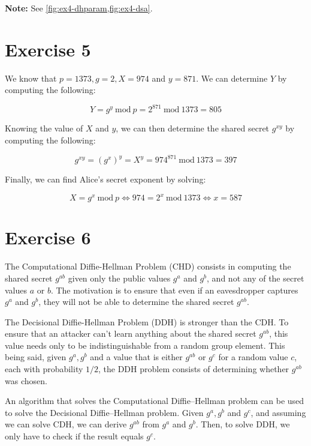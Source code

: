 \documentclass[a4paper]{article}
\begin{document}
\vspace{\baselineskip}

\textbf{Note:} See \cref{fig:ex4-dhparam,fig:ex4-dsa}.

\section*{Exercise 5}

We know that $p = 1373, g = 2, X = 974$ and $y = 871$. We can determine $Y$ by computing the
following:

\[
Y = g^y \ \mathrm{mod} \ p = 2^{871} \ \mathrm{mod} \ 1373 = 805
\]

Knowing the value of $X$ and $y$, we can then determine the shared secret $g^{xy}$ by computing
the following:

\[
g^{xy} = (g^x)^y = X ^ y = 974 ^ {871} \ \mathrm{mod} \ 1373 = 397
\]

\pagebreak

Finally, we can find Alice's secret exponent by solving:

\[
X = g^x \ \mathrm{mod} \ p \Leftrightarrow 974 = 2^x \ \mathrm{mod} \ 1373 \Leftrightarrow x = 587
\]

\section*{Exercise 6}

The Computational Diffie-Hellman Problem (CHD) consists in computing the shared secret $g^{ab}$ given
only the public values $g^a$ and $g^b$, and not any of the secret values $a$ or $b$. The motivation
is to ensure that even if an eavesdropper captures $g^a$ and $g^b$, they will not be able to determine
the shared secret $g^{ab}$.

The Decisional Diffie-Hellman Problem (DDH) is stronger than the CDH. To ensure that an attacker can't
learn anything about the shared secret $g^{ab}$, this value needs only to be indistinguishable from a
random group element. This being said, given $g^a, g^b$ and a value that is either $g^{ab}$ or $g^c$
for a random value $c$, each with probability $1/2$, the DDH problem consists of determining whether
$g^{ab}$ was chosen. 

An algorithm that solves the Computational Diffie–Hellman problem can be used to solve the Decisional
Diffie–Hellman problem. Given $g^a, g^b$ and $g^c$, and assuming we can solve CDH, we can derive $g^{ab}$
from $g^a$ and $g^b$. Then, to solve DDH, we only have to check if the result equals $g^c$.
\end{document}
